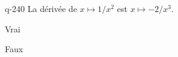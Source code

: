 \begin{truefalse}{q-240}
La dérivée de $x\mapsto 1/x^2$ est $x\mapsto -2/x^3$.
\item* Vrai
\item Faux
\end{truefalse}

